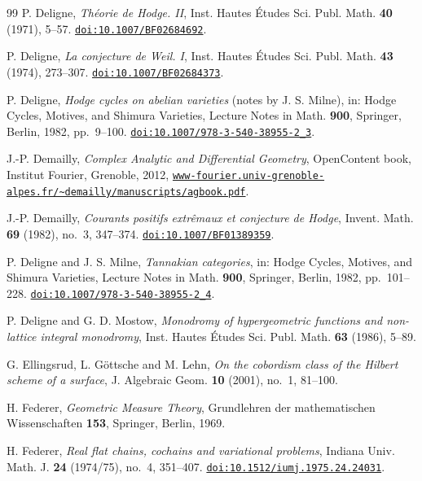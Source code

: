 \documentclass[11pt,reqno]{amsart}
\theoremstyle{plain}
\theoremstyle{definition}
\theoremstyle{remark}
\begin{document}
\begin{thebibliography}{99}
P. Deligne,
\emph{Th\'eorie de Hodge. II},
Inst. Hautes \'Etudes Sci. Publ. Math. \textbf{40} (1971), 5--57.
\href{https://doi.org/10.1007/BF02684692}{\texttt{doi:10.1007/BF02684692}}.

P. Deligne,
\emph{La conjecture de Weil. I},
Inst. Hautes \'Etudes Sci. Publ. Math. \textbf{43} (1974), 273--307.
\href{https://doi.org/10.1007/BF02684373}{\texttt{doi:10.1007/BF02684373}}.

P. Deligne,
\emph{Hodge cycles on abelian varieties} (notes by J. S. Milne),
in: Hodge Cycles, Motives, and Shimura Varieties,
Lecture Notes in Math. \textbf{900}, Springer, Berlin, 1982, pp.~9--100.
\href{https://doi.org/10.1007/978-3-540-38955-2_3}%
{\texttt{doi:10.1007/978-3-540-38955-2\_3}}.

J.-P. Demailly,
\emph{Complex Analytic and Differential Geometry},
OpenContent book, Institut Fourier, Grenoble, 2012,
\href{https://www-fourier.univ-grenoble-alpes.fr/~demailly/manuscripts/agbook.pdf}{\texttt{www-fourier.univ-grenoble-alpes.fr/\~{}demailly/manuscripts/agbook.pdf}}.

J.-P. Demailly,
\emph{Courants positifs extr\^emaux et conjecture de Hodge},
Invent. Math. \textbf{69} (1982), no.~3, 347--374.
\href{https://doi.org/10.1007/BF01389359}{\texttt{doi:10.1007/BF01389359}}.

P. Deligne and J. S. Milne,
\emph{Tannakian categories},
in: Hodge Cycles, Motives, and Shimura Varieties,
Lecture Notes in Math. \textbf{900}, Springer, Berlin, 1982, pp.~101--228.
\href{https://doi.org/10.1007/978-3-540-38955-2_4}%
{\texttt{doi:10.1007/978-3-540-38955-2\_4}}.

P. Deligne and G. D. Mostow,
\emph{Monodromy of hypergeometric functions and non-lattice integral
monodromy},
Inst. Hautes \'Etudes Sci. Publ. Math. \textbf{63} (1986), 5--89.

G. Ellingsrud, L. G\"ottsche and M. Lehn,
\emph{On the cobordism class of the Hilbert scheme of a surface},
J. Algebraic Geom. \textbf{10} (2001), no.~1, 81--100.

H. Federer,
\emph{Geometric Measure Theory},
Grundlehren der mathematischen Wissenschaften \textbf{153},
Springer, Berlin, 1969.

H. Federer,
\emph{Real flat chains, cochains and variational problems},
Indiana Univ. Math. J. \textbf{24} (1974/75), no.~4, 351--407.
\href{https://doi.org/10.1512/iumj.1975.24.24031}{\texttt{doi:10.1512/iumj.1975.24.24031}}.


\end{thebibliography}
\end{document}
